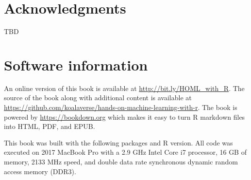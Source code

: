 \documentclass[]{krantz}
\begin{document}
\hypertarget{acknowledgments}{%
\section*{Acknowledgments}\label{acknowledgments}}


TBD

\hypertarget{software-information}{%
\section*{Software information}\label{software-information}}


An online version of this book is available at \url{http://bit.ly/HOML_with_R}. The source of the book along with additional content is available at \url{https://github.com/koalaverse/hands-on-machine-learning-with-r}. The book is powered by \url{https://bookdown.org} which makes it easy to turn R markdown files into HTML, PDF, and EPUB.

This book was built with the following packages and R version. All code was executed on 2017 MacBook Pro with a 2.9 GHz Intel Core i7 processor, 16 GB of memory, 2133 MHz speed, and double data rate synchronous dynamic random access memory (DDR3).
\end{document}
